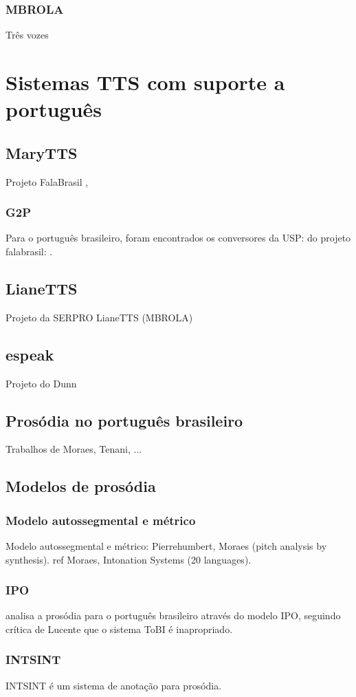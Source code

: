 \subsubsection{MBROLA}
Três vozes

\section{Sistemas TTS com suporte a português}
\subsection{MaryTTS}
Projeto FalaBrasil \cite{falabrasil}, \cite{couto}
\subsubsection{G2P}
Para o português brasileiro, foram encontrados os conversores
da USP: \cite{g2pusp} do projeto falabrasil: \cite{falabrasil}.
\subsection{LianeTTS}
Projeto da SERPRO LianeTTS (MBROLA)
\subsection{espeak}
Projeto do Dunn

\subsection{Prosódia no português brasileiro}
Trabalhos de Moraes, Tenani, ...
\subsection{Modelos de prosódia}
\subsubsection{Modelo autossegmental e métrico}
Modelo autossegmental e métrico: Pierrehumbert, Moraes (pitch analysis by synthesis).
ref Moraes, Intonation Systems (20 languages).
\subsubsection{IPO}
\cite{ipo} analisa a prosódia para o português brasileiro através do modelo IPO,
seguindo crítica de Lucente que o sistema ToBI é inapropriado.
\subsubsection{INTSINT}
INTSINT é um sistema de anotação para prosódia.
